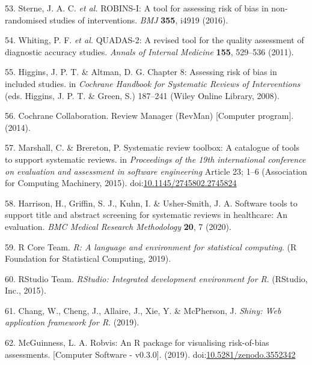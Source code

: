 \documentclass[a4paper, twoside]{templates/ociamthesis}
\begin{document}
\leavevmode\hypertarget{ref-sterne2016robins}{}%
53. Sterne, J. A. C. \emph{et al.} ROBINS-I: A tool for assessing risk of bias in non-randomised studies of interventions. \emph{BMJ} \textbf{355}, i4919 (2016).

\leavevmode\hypertarget{ref-whiting2011quadas}{}%
54. Whiting, P. F. \emph{et al.} QUADAS-2: A revised tool for the quality assessment of diagnostic accuracy studies. \emph{Annals of Internal Medicine} \textbf{155}, 529--536 (2011).

\leavevmode\hypertarget{ref-higgins2008assessing}{}%
55. Higgins, J. P. T. \& Altman, D. G. Chapter 8: Assessing risk of bias in included studies. in \emph{Cochrane Handbook for Systematic Reviews of Interventions} (eds. Higgins, J. P. T. \& Green, S.) 187--241 (Wiley Online Library, 2008).

\leavevmode\hypertarget{ref-cochrane2014review}{}%
56. Cochrane Collaboration. Review Manager (RevMan) {[}Computer program{]}. (2014).

\leavevmode\hypertarget{ref-marshall2015systematic}{}%
57. Marshall, C. \& Brereton, P. Systematic review toolbox: A catalogue of tools to support systematic reviews. in \emph{Proceedings of the 19th international conference on evaluation and assessment in software engineering} Article 23; 1--6 (Association for Computing Machinery, 2015). doi:\href{https://doi.org/10.1145/2745802.2745824}{10.1145/2745802.2745824}

\leavevmode\hypertarget{ref-harrison2020software}{}%
58. Harrison, H., Griffin, S. J., Kuhn, I. \& Usher-Smith, J. A. Software tools to support title and abstract screening for systematic reviews in healthcare: An evaluation. \emph{BMC Medical Research Methodology} \textbf{20}, 7 (2020).

\leavevmode\hypertarget{ref-rref}{}%
59. R Core Team. \emph{R: A language and environment for statistical computing}. (R Foundation for Statistical Computing, 2019).

\leavevmode\hypertarget{ref-rstudioref}{}%
60. RStudio Team. \emph{RStudio: Integrated development environment for R}. (RStudio, Inc., 2015).

\leavevmode\hypertarget{ref-shinyref}{}%
61. Chang, W., Cheng, J., Allaire, J., Xie, Y. \& McPherson, J. \emph{Shiny: Web application framework for R}. (2019).

\leavevmode\hypertarget{ref-mcguinness2019a}{}%
62. McGuinness, L. A. Robvis: An R package for visualising risk-of-bias assessments. {[}Computer Software - v0.3.0{]}. (2019). doi:\href{https://doi.org/10.5281/zenodo.3552342}{10.5281/zenodo.3552342}
\end{document}
